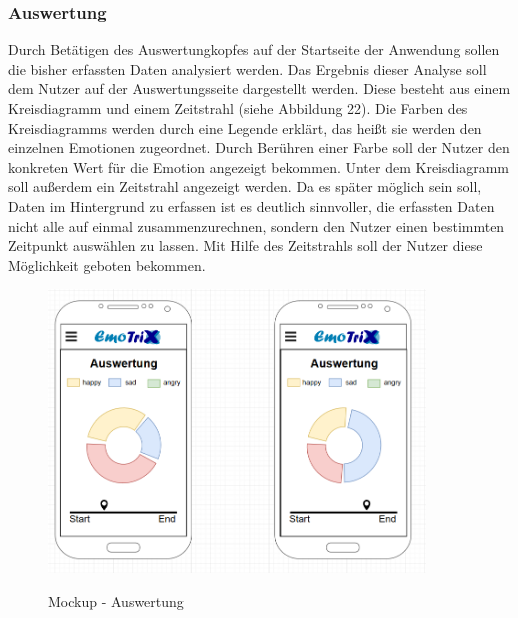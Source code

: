 \subsubsection{Auswertung}
Durch Betätigen des Auswertungkopfes auf der Startseite der Anwendung sollen die bisher erfassten Daten analysiert werden. Das Ergebnis dieser Analyse soll dem Nutzer auf der Auswertungsseite dargestellt werden. Diese besteht aus einem Kreisdiagramm und einem Zeitstrahl (siehe Abbildung 22).
\newline
Die Farben des Kreisdiagramms werden durch eine Legende erklärt, das heißt sie werden den einzelnen Emotionen zugeordnet. Durch Berühren einer Farbe soll der Nutzer den konkreten Wert für die Emotion angezeigt bekommen. Unter dem Kreisdiagramm soll außerdem ein Zeitstrahl angezeigt werden. Da es später möglich sein soll, Daten im Hintergrund zu erfassen ist es deutlich sinnvoller, die erfassten Daten nicht alle auf einmal zusammenzurechnen, sondern den Nutzer einen bestimmten Zeitpunkt auswählen zu lassen. Mit Hilfe des Zeitstrahls soll der Nutzer diese Möglichkeit geboten bekommen. 
\begin{figure}[h]
	\centering
	\includegraphics[width=10cm]{Bilder/Mockup-Auswertung.png}
	\label{img:Mockup-Auswertung}
	\caption[Mockup - Auswertung]{Mockup - Auswertung}
\end{figure}
\newline \newline \newline \newline \newline \newline